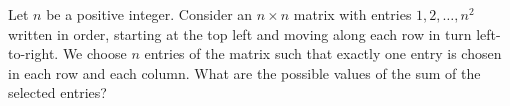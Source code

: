 Let \( n\) be a positive integer. Consider an \( n\times n\) matrix with entries \( 1,2,\dots,n^2\) written in order, starting at the top left and moving along each row in turn left-to-right. 
We choose \( n\) entries of the matrix such that exactly one entry is chosen in each row and each column. What are the possible values of the sum of the selected entries?